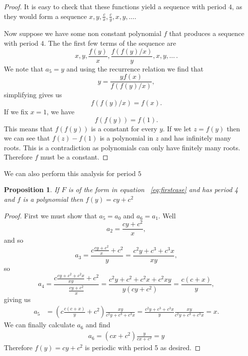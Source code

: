 \documentclass[12pt]{article}
\newtheorem{proposition}{Proposition}
\begin{document}
\begin{proof}
It is easy to check that these functions yield a sequence with period $4$, as they would form a sequence $x,y, \frac{c}{x}, \frac{c}{y}, x, y, \ldots$. 

Now suppose we have some non constant polynomial  $f$ that produces a sequence with period $4$. The  the first few terms of the sequence are 
\begin{equation*}
x, y, \dfrac{f(y)}{x}, \dfrac{f(f(y)/x)}{y}, x, y, \dots \, .
\end{equation*}
We note that $a_5 =y$ and using the recurrence relation we find that 
\begin{equation*}
 y = \dfrac{yf(x)}{f(f(y)/x)}, 
 \end{equation*}
simplifying gives us  
\begin{equation*}
 f(f(y)/x) = f(x).
\end{equation*}
If we fix $x = 1$, we have
\begin{equation*}
f(f(y)) = f(1). 
\end{equation*}
This means that $f(f(y))$ is a constant for every $y$. If we let $z=f(y)$ then we can see that $f(z)-f(1)$ is a polynomial in $z$ and has infinitely many roots. This is a contradiction as polynomials can only have finitely many roots. Therefore $f$ must be a constant. 
\end{proof}

We can also perform this analysis for period $5$  
\begin{proposition}
If $F$ is of the form in equation ~\ref{eq:firstcase} and has period 4 and $f$ is a polynomial then $f(y) = cy+c^2$
\end{proposition}
\begin{proof}
First we must show that $a_5=a_0$ and $a_6=a_1$. Well 
\begin{equation*}
a_2 = \frac{cy+c^2}{x},
\end{equation*}
and so 
\begin{equation*}
a_3 = \frac{ c \frac{cy+c^2}{x} +c^2}{y} = \frac{c^2y + c^3+c^3x}{xy},
\end{equation*}
so
\begin{equation*}
a_4  = \frac{c \frac{cy + c^2+c^2x}{xy} +c^2}{\frac{cy+c^2}{x}} = \frac{c^2y+c^2+c^2x+c^2xy}{y(cy+c^2)} = \frac{c(c+x)}{y},
\end{equation*}
giving us 
\begin{align*}
a_5 &=\left(c \frac{c(c+x)}{y} + c^2\right) \frac{xy}{c^2y+c^3+c^3x} = \frac{c^2y+c^3+c^3x}{y} \frac{xy}{c^2y+c^3+c^3x}= x.
\end{align*}
We can finally calculate $a_6$ and find 
\begin{align*}
a_6 = (cx + c^2) \frac{y}{cx+c^2} = y
\end{align*}
Therefore $f(y)=cy+c^2$ is periodic with period 5 as desired. 
\end{proof}
\end{document}
